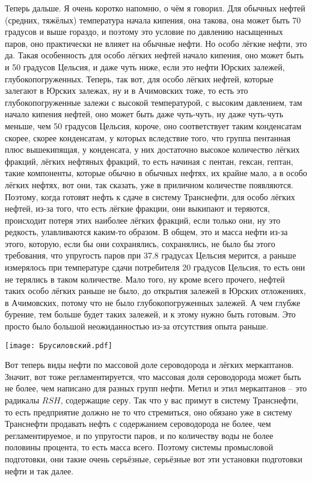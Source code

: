 \documentclass[main.tex]{subfiles}
\begin{document}
Теперь дальше.
Я очень коротко напомню, о чём я говорил.
Для обычных нефтей (средних, тяжёлых) температура начала кипения, она такова, она может быть 70 градусов и выше гораздо, и поэтому это условие по давлению насыщенных паров, оно практически не влияет на обычные нефти.
Но особо лёгкие нефти, это да.
Такая особенность для особо лёгких нефтей начало кипения, оно может быть и 50 градусов Цельсия, и даже чуть ниже, если это нефти Юрских залежей, глубокопогруженных.
Теперь, так вот, для особо лёгких нефтей, которые залегают в Юрских залежах, ну и в Ачимовских тоже, то есть это глубокопогруженные залежи с высокой температурой, с высоким давлением, там начало кипения нефтей, оно может быть даже чуть-чуть, ну даже чуть-чуть меньше, чем 50 градусов Цельсия, короче, оно соответствует таким конденсатам скорее, скорее конденсатам, у которых вследствие того, что группа пентанная плюс вышекипящая, у конденсата, у них достаточно высокое количество лёгких фракций, лёгких нефтяных фракций, то есть начиная с пентан, гексан, гептан, такие компоненты, которые обычно в обычных нефтях, их крайне мало, а в особо лёгких нефтях, вот они, так сказать, уже в приличном количестве появляются.
Поэтому, когда готовят нефть к сдаче в систему Транснефти, для особо лёгких нефтей,
из-за того, что есть лёгкие фракции, они выкипают и теряются, происходит потеря этих наиболее лёгких фракций, если только они, ну это редкость, улавливаются каким-то образом.
В общем, это и масса нефти из-за этого, которую, если бы они сохранялись, сохранялись, не было бы этого требования, что упругость паров при 37.8 градусах Цельсия мерится,
а раньше измерялось при температуре сдачи потребителя 20 градусов Цельсия, то есть они не терялись в таком количестве.
Мало того, ну кроме всего прочего, нефтей таких особо лёгких раньше не было, до открытия залежей в Юрских отложениях, в Ачимовских, потому что не было глубокопогруженных залежей.
А чем глубже бурение, тем больше будет таких залежей, и к этому нужно быть готовым.
Это просто было большой неожиданностью из-за отсутствия опыта раньше.

\begin{center}
\texttt{[image: Брусиловский.pdf]}
\end{center}

Вот теперь виды нефти по массовой доле сероводорода и лёгких меркаптанов.
Значит, вот тоже регламентируется, что массовая доля сероводорода может быть не более, чем написано для разных групп нефти.
Метил и этил меркаптанов -- это радикалы $RSH$, содержащие серу.
Так что у вас примут в систему Транснефти, то есть предприятие должно не то что стремиться, оно обязано уже в систему Транснефти продавать нефть с содержанием сероводорода не более, чем регламентируемое, и по упругости паров, и по количеству воды не более половины процента, то есть масса всего.
Поэтому системы промысловой подготовки, они такие очень серьёзные, серьёзные вот эти установки подготовки нефти и так далее.
\end{document}
